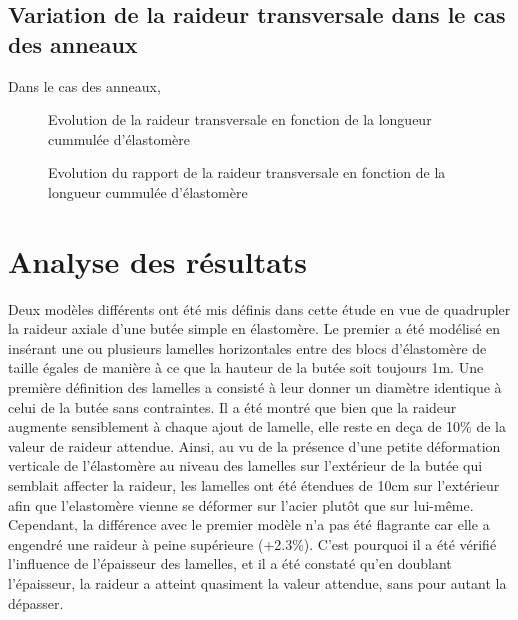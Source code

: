 ﻿\documentclass{article}
\newcommand{\cimg}{0.8}
\begin{document}
\subsection{Variation de la raideur transversale dans le cas des anneaux}
Dans le cas des anneaux, 


\begin{figure}
	\begin{minipage}[c]{.45\linewidth}
	\begin{center}
	\caption{Evolution de la raideur transversale en fonction de la longueur cummulée d'élastomère}
	\label{fig:elast_long_cum}
	\end{center}
	\end{minipage}
	\hfill
	\begin{minipage}[c]{.45\linewidth}
	\begin{center}
	\caption{Evolution du rapport de la raideur transversale en fonction de la longueur cummulée d'élastomère}
	\label{fig:elast_long_cum}
	\end{center}
	\end{minipage}
\end{figure}

\section{Analyse des résultats}

Deux modèles différents ont été mis définis dans cette étude en vue de quadrupler la raideur axiale d'une butée simple en élastomère. Le premier a été modélisé en insérant une ou plusieurs lamelles horizontales entre des blocs d'élastomère de taille égales de manière à ce que la hauteur de la butée soit toujours 1m. Une première définition des lamelles a consisté à leur donner un diamètre identique à celui de la butée sans contraintes. Il a été montré que bien que la raideur augmente sensiblement à chaque ajout de lamelle, elle reste en deça de 10\% de la valeur de raideur attendue. Ainsi, au vu de la présence d'une petite déformation verticale de l'élastomère au niveau des lamelles sur l'extérieur de la butée qui semblait affecter la raideur, les lamelles ont été étendues de 10cm sur l'extérieur afin que l'elastomère vienne se déformer sur l'acier plutôt que sur lui-même. Cependant, la différence avec le premier modèle n'a pas été flagrante car elle a engendré une raideur à peine supérieure (+2.3\%). C'est pourquoi il a été vérifié l'influence de l'épaisseur des lamelles, et il a été constaté qu'en doublant l'épaisseur, la raideur a atteint quasiment la valeur attendue, sans pour autant la dépasser.
\\
\end{document}

